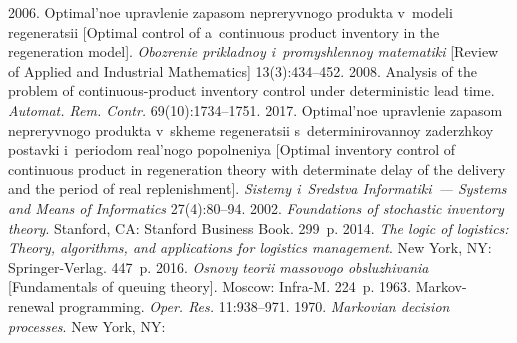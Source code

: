 


 


  \begin{multicols}{2}

\renewcommand{\bibname}{\protect\rmfamily References}

{\small\frenchspacing
 {%
 \begin{thebibliography}{99}
 2006. Optimal'noe upravlenie zapasom 
nepreryvnogo produkta v~modeli regeneratsii [Optimal control of a~continuous 
product inventory in the regeneration model]. \textit{Obozrenie prikladnoy 
i~promyshlennoy matematiki} [Review of Applied and Industrial Mathematics] 13(3):434--452.
 2008. Analysis of the problem of 
continuous-product inventory control under deterministic lead time. \textit{Automat. 
Rem. Contr.} 69(10):1734--1751.
 2017. Optimal'noe upravlenie zapasom 
nepreryvnogo produkta v~skheme regeneratsii s~determinirovannoy zaderzhkoy 
postavki i~periodom real'nogo popolneniya [Optimal inventory control of 
continuous product in regeneration theory with determinate delay of the 
delivery and the period of real replenishment]. \textit{Sistemy i~Sredstva Informatiki~--- 
Systems and Means of Informatics} 27(4):80--94.
 2002. \textit{Foundations of stochastic inventory theory}. 
Stanford, CA: Stanford Business Book. 299~p.
 2014. \textit{The logic of logistics: 
Theory, algorithms, and applications for logistics management}. New York, 
NY: Springer-Verlag. 447~p.
 2016. \textit{Osnovy teorii massovogo obsluzhivania} 
[Fundamentals of queuing theory]. Moscow: Infra-M. 224~p.
 1963. Markov-renewal programming. \textit{Oper. Res.} 11:938--971.
 1970. \textit{Markovian decision processes}. New York, NY: 

\end{thebibliography}}}
\end{multicols}
